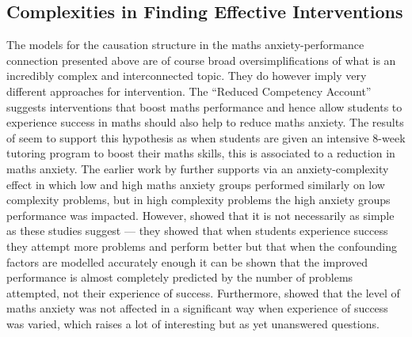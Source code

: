 \documentclass[twoside,12pt,a4paper]{report}
\begin{document}
\subsection*{Complexities in Finding Effective Interventions}

The models for the causation structure in the maths anxiety-performance connection presented above are of course broad oversimplifications of what is an incredibly complex and interconnected topic. They do however imply very different approaches for intervention. The ``Reduced Competency Account'' suggests interventions that boost maths performance and hence allow students to experience success in maths should also help to reduce maths anxiety. The results of   seem to support this hypothesis as when students are given an intensive 8-week tutoring program to boost their maths skills, this is associated to a reduction in maths anxiety. The earlier work by  further supports via an anxiety-complexity effect in which low and high maths anxiety groups performed similarly on low complexity problems, but in high complexity problems the high anxiety groups performance was impacted. However,  showed that it is not necessarily as simple as these studies suggest --- they showed that when students experience success they attempt more problems and perform better but that when the confounding factors are modelled accurately enough it can be shown that the improved performance is almost completely predicted by the number of problems attempted, not their experience of success. Furthermore,  showed that the level of maths anxiety was not affected in a significant way when experience of success was varied, which raises a lot of interesting but as yet unanswered questions. 
	
\end{document}
